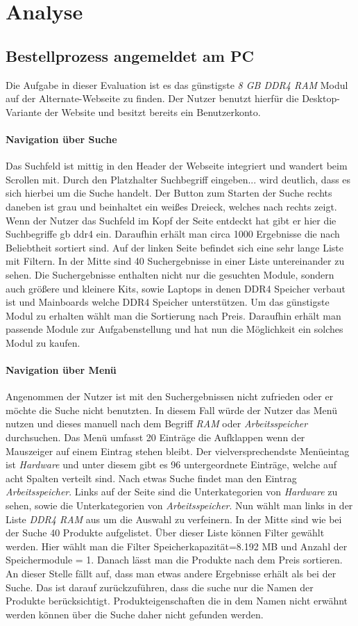 \documentclass[	12pt, 
				a4paper, 
				BCOR=10mm, %
				DIV=12, 
				parskip=half, %
				headings=small, %
				twoside, %
				ngerman,
				bibliography=totoc,index=totoc, listof=totoc,
				numbers=noendperiod
				]{scrbook} %
\theoremstyle{plain}%
\theoremstyle{definition}
\theoremstyle{remark}
\begin{document}
\section{Analyse}
\subsection{Bestellprozess angemeldet am PC}
Die Aufgabe in dieser Evaluation ist es das günstigste \textit{8 GB DDR4 RAM} Modul auf der Alternate-Webseite zu finden. Der Nutzer benutzt hierfür die Desktop-Variante der Website und besitzt bereits ein Benutzerkonto.
\paragraph{Navigation über Suche}
Das Suchfeld ist mittig in den Header der Webseite integriert und wandert beim Scrollen mit. Durch den Platzhalter \glqq Suchbegriff eingeben...\grqq{} wird deutlich, dass es sich hierbei um die Suche handelt. Der Button zum Starten der Suche rechts daneben ist grau und beinhaltet ein weißes Dreieck, welches nach rechts zeigt.
Wenn der Nutzer das Suchfeld im Kopf der Seite entdeckt hat gibt er hier die Suchbegriffe  gb ddr4\grqq{} ein. Daraufhin erhält man circa 1000 Ergebnisse die nach Beliebtheit sortiert sind. Auf der linken Seite befindet sich eine sehr lange Liste mit Filtern. In der Mitte sind 40 Suchergebnisse in einer Liste untereinander zu sehen. Die Suchergebnisse enthalten nicht nur die gesuchten Module, sondern auch größere und kleinere Kits, sowie Laptops in denen DDR4 Speicher verbaut ist und Mainboards welche DDR4 Speicher unterstützen.
Um das günstigste Modul zu erhalten wählt man die Sortierung nach Preis. Daraufhin erhält man passende Module zur Aufgabenstellung und hat nun die Möglichkeit ein solches Modul zu kaufen.
\paragraph{Navigation über Menü}
Angenommen der Nutzer ist mit den Suchergebnissen nicht zufrieden oder er möchte die Suche nicht benutzten. In diesem Fall würde der Nutzer das Menü nutzen und dieses manuell nach dem Begriff \textit{RAM} oder \textit{Arbeitsspeicher} durchsuchen. Das Menü umfasst 20 Einträge die Aufklappen wenn der Mauszeiger auf einem Eintrag stehen bleibt. Der vielversprechendste Menüeintag ist \textit{Hardware} und unter diesem gibt es 96 untergeordnete Einträge, welche auf acht Spalten verteilt sind. Nach etwas Suche findet man den Eintrag \textit{Arbeitsspeicher}. Links auf der Seite sind die Unterkategorien von \textit{Hardware} zu sehen, sowie die Unterkategorien von \textit{Arbeitsspeicher}. Nun wählt man links in der Liste \textit{DDR4 RAM} aus um die Auswahl zu verfeinern. In der Mitte sind wie bei der Suche 40 Produkte aufgelistet. Über dieser Liste können Filter gewählt werden. Hier wählt man die Filter \glqq Speicherkapazität=8.192 MB\grqq{} und \glqq Anzahl der Speichermodule = 1\grqq{}. Danach lässt man die Produkte nach dem Preis sortieren. An dieser Stelle fällt auf, dass man etwas andere Ergebnisse erhält als bei der Suche. Das ist darauf zurückzuführen, dass die suche nur die Namen der Produkte berücksichtigt. Produkteigenschaften die in dem Namen nicht erwähnt werden können über die Suche daher nicht gefunden werden.
\end{document}
